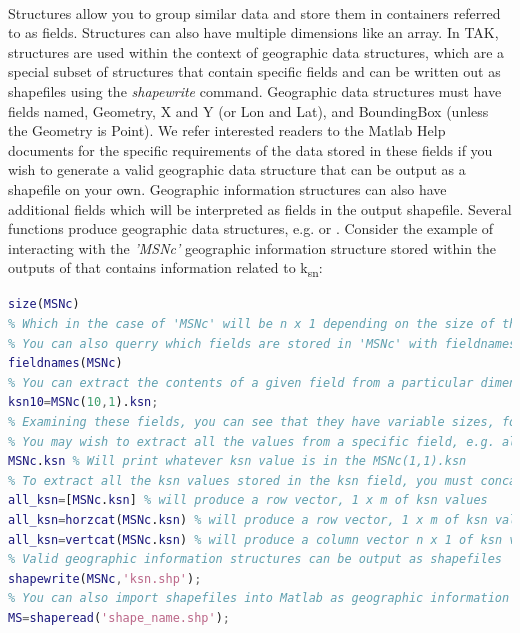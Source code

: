 \paragraph{}Structures allow you to group similar data and store them in containers referred to as fields. Structures can also have multiple dimensions like an array. In TAK, structures are used within the context of geographic data structures, which are a special subset of structures that contain specific fields and can be written out as shapefiles using the \textit{shapewrite} command. Geographic data structures must have fields named, Geometry, X and Y (or Lon and Lat), and BoundingBox (unless the Geometry is Point). We refer interested readers to the Matlab Help documents for the specific requirements of the data stored in these fields if you wish to generate a valid geographic data structure that can be output as a shapefile on your own. Geographic information structures can also have additional fields which will be interpreted as fields in the output shapefile. Several functions produce geographic data structures, e.g.  or . Consider the example of interacting with the \textit{'MSNc'} geographic information structure stored within the outputs of  that contains information related to k\textsubscript{sn}:

\begin{lstlisting}[language=Matlab]
% You can querry the dimensions of a structure with size
size(MSNc)
% Which in the case of 'MSNc' will be n x 1 depending on the size of the stream network
% You can also querry which fields are stored in 'MSNc' with fieldnames
fieldnames(MSNc)
% You can extract the contents of a given field from a particular dimension, for example to extract what's stored in the 'ksn' field in the 10th element
ksn10=MSNc(10,1).ksn;
% Examining these fields, you can see that they have variable sizes, for example the 'Geometry' field has a single entry per element that is 'Line', indicating that the shapefile Geometry type is Line, where as the X and Y fields will have n x 1 arrays specifying the X and Y coordinates of line segments
% You may wish to extract all the values from a specific field, e.g. all the normalized steepness values stored in the ksn field, but unlike with a table if you simply call a field without specifying a dimension, you will get the first element, not the entire list of elements
MSNc.ksn % Will print whatever ksn value is in the MSNc(1,1).ksn
% To extract all the ksn values stored in the ksn field, you must concatenate the field values
all_ksn=[MSNc.ksn] % will produce a row vector, 1 x m of ksn values
all_ksn=horzcat(MSNc.ksn) % will produce a row vector, 1 x m of ksn values
all_ksn=vertcat(MSNc.ksn) % will produce a column vector n x 1 of ksn values
% Valid geographic information structures can be output as shapefiles
shapewrite(MSNc,'ksn.shp');
% You can also import shapefiles into Matlab as geographic information structures
MS=shaperead('shape_name.shp');
\end{lstlisting}

